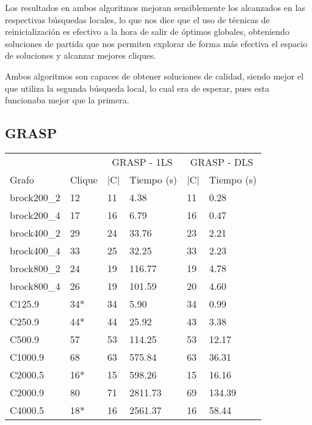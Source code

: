 Los resultados en ambos algoritmos mejoran sensiblemente los alcanzados en las
respectivas búsquedas locales, lo que nos dice que el uso de técnicas de reinicialización
es efectivo a la hora de salir de óptimos globales, obteniendo soluciones de partida
que nos permiten explorar de forma más efectiva el espacio de soluciones y alcanzar
mejores cliques.

Ambos algoritmos son capaces de obtener soluciones de calidad, siendo mejor el que
utiliza la segunda búsqueda local, lo cual era de esperar, pues esta funcionaba
mejor que la primera.

\subsection{GRASP}

\begin{small}
\begin{longtable}{l l l l l l}
  \label{table:grasp}\\
    & & \multicolumn{2}{c}{GRASP - 1LS} & \multicolumn{2}{c}{GRASP - DLS} \\ \cline{3-6}
    Grafo              & Clique & |C| & Tiempo (s) & |C| & Tiempo (s) \\ \hline
    \endhead
    \endfoot
    brock200\_2        & 12 & 11 & 4.38 & 11 & 0.28\\ \hline
    brock200\_4        & 17 & 16 & 6.79 & 16 & 0.47\\ \hline
    brock400\_2        & 29 & 24 & 33.76 & 23 & 2.21\\ \hline
    brock400\_4        & 33 & 25 & 32.25 & 33 & 2.23\\ \hline
    brock800\_2        & 24 & 19 & 116.77 & 19 & 4.78\\ \hline
    brock800\_4        & 26 & 19 & 101.59 & 20 & 4.60\\ \hline
    C125.9             & 34* & 34 & 5.90 & 34 & 0.99\\ \hline
    C250.9             & 44* & 44 & 25.92 & 43 & 3.38\\ \hline
    C500.9             & 57 & 53 & 114.25 & 53 & 12.17\\ \hline
    C1000.9            & 68 & 63 & 575.84 & 63 & 36.31\\ \hline
    C2000.5            & 16* & 15 & 598.26 & 15 & 16.16\\ \hline
    C2000.9            & 80 & 71 & 2811.73 & 69 & 134.39\\ \hline
    C4000.5            & 18* & 16 & 2561.37 & 16 & 58.44\\ \hline

\end{longtable}
\end{small}
